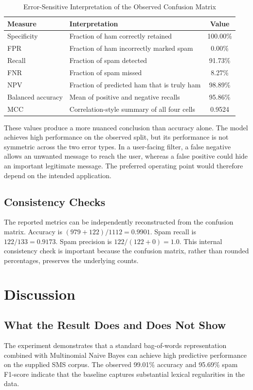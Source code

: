 \documentclass[conference]{IEEEtran}
\begin{document}
\begin{table}[t]
\caption{Error-Sensitive Interpretation of the Observed Confusion Matrix}
\label{tab:errorprofile}
\centering
\scriptsize
\begin{tabular}{p{2.3cm}p{4.1cm}c}
\toprule
Measure & Interpretation & Value \\
\midrule
Specificity & Fraction of ham correctly retained & 100.00\% \\
FPR & Fraction of ham incorrectly marked spam & 0.00\% \\
Recall & Fraction of spam detected & 91.73\% \\
FNR & Fraction of spam missed & 8.27\% \\
NPV & Fraction of predicted ham that is truly ham & 98.89\% \\
Balanced accuracy & Mean of positive and negative recalls & 95.86\% \\
MCC & Correlation-style summary of all four cells & 0.9524 \\
\bottomrule
\end{tabular}
\end{table}

These values produce a more nuanced conclusion than accuracy alone. The model achieves high performance on the observed split, but its performance is not symmetric across the two error types. In a user-facing filter, a false negative allows an unwanted message to reach the user, whereas a false positive could hide an important legitimate message. The preferred operating point would therefore depend on the intended application.

\subsection{Consistency Checks}
The reported metrics can be independently reconstructed from the confusion matrix. Accuracy is $(979+122)/1112=0.9901$. Spam recall is $122/133=0.9173$. Spam precision is $122/(122+0)=1.0$. This internal consistency check is important because the confusion matrix, rather than rounded percentages, preserves the underlying counts.

\section{Discussion}
\subsection{What the Result Does and Does Not Show}
The experiment demonstrates that a standard bag-of-words representation combined with Multinomial Naive Bayes can achieve high predictive performance on the supplied SMS corpus. The observed 99.01\% accuracy and 95.69\% spam F1-score indicate that the baseline captures substantial lexical regularities in the data.
\end{document}
